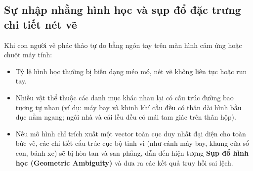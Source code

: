 \documentclass[12pt,a4paper]{report}
\begin{document}
\subsection{Sự nhập nhằng hình học và sụp đổ đặc trưng chi tiết nét vẽ}
Khi con người vẽ phác thảo tự do bằng ngón tay trên màn hình cảm ứng hoặc chuột máy tính:
\begin{itemize}[leftmargin=*]
    \item Tỷ lệ hình học thường bị biến dạng méo mó, nét vẽ không liên tục hoặc run tay.
    \item Nhiều vật thể thuộc các danh mục khác nhau lại có cấu trúc đường bao tương tự nhau (ví dụ: máy bay và khinh khí cầu đều có thân dài hình bầu dục nằm ngang; ngôi nhà và cái lều đều có mái tam giác trên thân hộp).
    \item Nếu mô hình chỉ trích xuất một vector toàn cục duy nhất đại diện cho toàn bức vẽ, các chi tiết cấu trúc cục bộ tinh vi (như cánh máy bay, khung cửa sổ con, bánh xe) sẽ bị hòa tan và san phẳng, dẫn đến hiện tượng \textbf{Sụp đổ hình học (Geometric Ambiguity)} và đưa ra các kết quả truy hồi sai lệch.
\end{itemize}
\end{document}
